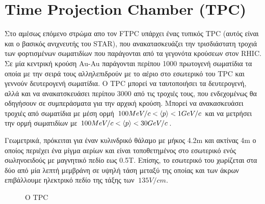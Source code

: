\section{Time Projection Chamber (TPC)}

	Στο αμέσως επόμενο στρώμα απο τον FTPC υπάρχει ένας τυπικός TPC (αυτός είναι και ο βασικός ανιχνευτής του STAR), που ανακατασκευάζει την τρισδιάστατη τροχιά των φορτισμένων σωματιδίων που παράγονται από τα γεγονότα κρούσεων στον RHIC. 
	Σε μία κεντρική κρούση Au-Au παράγονται περίπου 1000 πρωτογενή σωματίδια τα οποία με την σειρά τους αλληλεπιδρούν με το αέριο στο εσωτερικό του TPC και γεννούν  δευτερογενή σωματίδια. 
	Ο TPC μπορεί να ταυτοποιήσει τα δευτερογενή, αλλά και να ανακατσκευάσει περίπου 3000 από τις τροχιές τους, που ενδεχομένως θα οδηγήσουν σε συμπεράσματα για την αρχική κρούση. Μπορεί να ανακασκευάσει τροχιές από σωματίδια με μέση ορμή $100MeV/c<\braket{p}<1GeV/c$ και να μετρήσει την ορμή σωματιδίων με $100MeV/c<\braket{p}<30GeV/c$.
	
	Γεωμετρικά, πρόκειται για έναν κυλινδρικό θάλαμο με μήκος 4.2m και ακτίνας 4m ο οποίος περιέχει ένα μίγμα αερίων και είναι τοποθετημένος στο εσωτερικό ενός σωληνοειδούς με μαγνητικό πεδίο εως 0.5Τ. Επίσης, το εσωτερικό του χωρίζεται στα δύο από μία λεπτή μεμβράνη σε υψηλή τάση μεταξύ της οποίας και των άκρων επιβάλλουμε ηλεκτρικό πεδίο της τάξης των $~135V/cm$.
	
\begin{figure}[h!]
    \centering
    \qquad
    \caption{O TPC }%
    \label{fig3.6}%
\end{figure}					
	 
